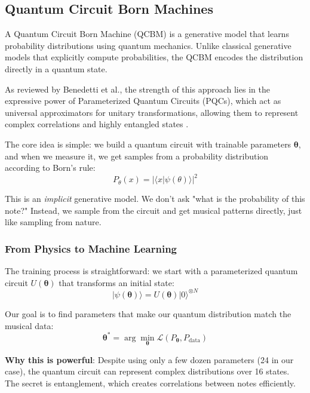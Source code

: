 \documentclass[11pt,a4paper]{article}
\begin{document}
\subsection{Quantum Circuit Born Machines}

A Quantum Circuit Born Machine (QCBM) is a generative model that learns probability distributions using quantum mechanics. Unlike classical generative models that explicitly compute probabilities, the QCBM encodes the distribution directly in a quantum state.

As reviewed by Benedetti et al., the strength of this approach lies in the expressive power of Parameterized Quantum Circuits (PQCs), which act as universal approximators for unitary transformations, allowing them to represent complex correlations and highly entangled states \cite{Benedetti2019}.

The core idea is simple: we build a quantum circuit with trainable parameters $\boldsymbol{\theta}$, and when we measure it, we get samples from a probability distribution according to Born's rule:
\begin{equation}
    P_\theta(x) = |\langle x | \psi(\theta) \rangle|^2
\end{equation}

This is an \textit{implicit} generative model. We don't ask "what is the probability of this note?" Instead, we sample from the circuit and get musical patterns directly, just like sampling from nature.

\subsubsection{From Physics to Machine Learning}
The training process is straightforward: we start with a parameterized quantum circuit $U(\boldsymbol{\theta})$ that transforms an initial state:
\[
|\psi(\boldsymbol{\theta})\rangle = U(\boldsymbol{\theta})|0\rangle^{\otimes N}
\]

Our goal is to find parameters that make our quantum distribution match the musical data:
\begin{equation}
\boldsymbol{\theta}^* = \arg\min_{\boldsymbol{\theta}} \mathcal{L}(P_{\boldsymbol{\theta}}, P_{\text{data}})
\end{equation}

\textbf{Why this is powerful}: Despite using only a few dozen parameters (24 in our case), the quantum circuit can represent complex distributions over 16 states. The secret is entanglement, which creates correlations between notes efficiently.
\end{document}
